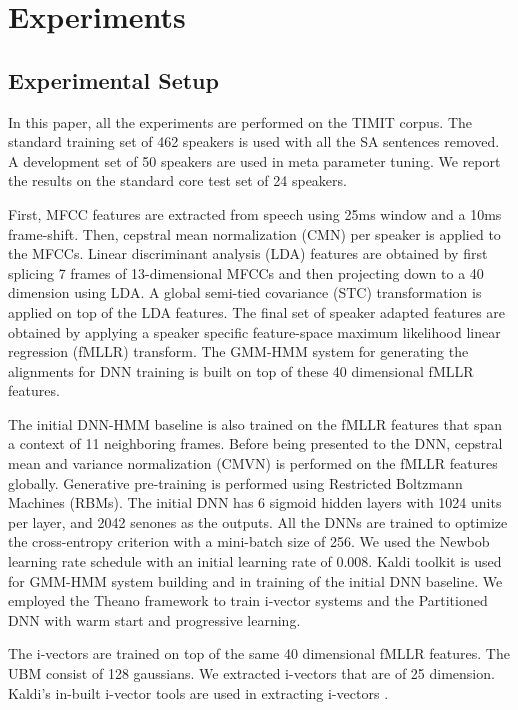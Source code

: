 \documentclass[a4paper]{article}
\begin{document}
 \section{Experiments}
 
 \subsection{Experimental Setup}
 
 In this paper, all the experiments are performed on the TIMIT corpus. The standard training set of 462 speakers is used with all the SA sentences removed. A development set of 50 speakers are used in meta parameter tuning. We report the results on the standard core test set of 24 speakers. 
 
First, MFCC features are extracted from speech using 25ms window and a 10ms frame-shift. Then, cepstral mean normalization (CMN) per speaker is applied to the MFCCs. Linear discriminant analysis (LDA) features are obtained by first splicing 7 frames of 13-dimensional MFCCs and then projecting down to a 40 dimension using LDA.  A global semi-tied covariance (STC) transformation \cite{STC} is applied on top of the LDA features.  The final set of speaker adapted features are obtained by applying a speaker specific feature-space maximum likelihood linear regression (fMLLR) transform. The GMM-HMM system for generating the alignments for DNN training is built on top of these 40 dimensional fMLLR features.  


The initial DNN-HMM baseline is also trained on the fMLLR features that span a context of 11 neighboring frames.  Before being presented to the DNN, cepstral mean and variance normalization (CMVN) is performed on the fMLLR features globally.  Generative pre-training is performed using Restricted Boltzmann Machines (RBMs).  The initial DNN has  6 sigmoid hidden layers with 1024 units per layer, and 2042 senones as the outputs.  All the DNNs are trained to optimize the cross-entropy criterion with a mini-batch size of 256.  We used the Newbob learning rate schedule with an initial learning rate of 0.008.  Kaldi toolkit \cite{KALDI}  is used for GMM-HMM system building and in training of the initial DNN baseline.  We employed the Theano framework \cite{Theano2} to train i-vector systems and the Partitioned DNN with warm start and progressive learning. 

The i-vectors are trained on top of the same 40 dimensional fMLLR features. The UBM consist of 128 gaussians. We extracted i-vectors that are of 25 dimension.  Kaldi's in-built i-vector tools are used in extracting i-vectors \cite{KALDI}. 
\end{document}

